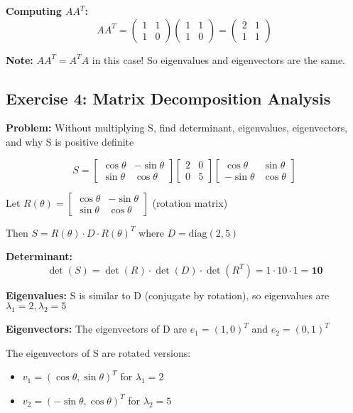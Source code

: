 \documentclass[12pt,a4paper]{article}
\begin{document}
\textbf{Computing $AA^T$:}
$$AA^T = \begin{pmatrix} 1 & 1 \\ 1 & 0 \end{pmatrix}\begin{pmatrix} 1 & 1 \\ 1 & 0 \end{pmatrix} = \begin{pmatrix} 2 & 1 \\ 1 & 1 \end{pmatrix}$$

\textbf{Note:} $AA^T = A^T A$ in this case! So eigenvalues and eigenvectors are the same.

\subsection{Exercise 4: Matrix Decomposition Analysis}

\textbf{Problem:} Without multiplying S, find determinant, eigenvalues, eigenvectors, and why S is positive definite

$$S = \begin{bmatrix} \cos \theta & -\sin \theta \\ \sin \theta & \cos \theta \end{bmatrix}\begin{bmatrix} 2 & 0 \\ 0 & 5 \end{bmatrix}\begin{bmatrix} \cos \theta & \sin \theta \\ -\sin \theta & \cos \theta \end{bmatrix}$$

Let $R(\theta) = \begin{bmatrix} \cos \theta & -\sin \theta \\ \sin \theta & \cos \theta \end{bmatrix}$ (rotation matrix)

Then $S = R(\theta) \cdot D \cdot R(\theta)^T$ where $D = \text{diag}(2, 5)$

\textbf{Determinant:}
$$\det(S) = \det(R) \cdot \det(D) \cdot \det(R^T) = 1 \cdot 10 \cdot 1 = \textbf{10}$$

\textbf{Eigenvalues:}
S is similar to D (conjugate by rotation), so eigenvalues are \textbf{$\lambda_1 = 2, \lambda_2 = 5$}

\textbf{Eigenvectors:}
The eigenvectors of D are $e_1 = (1,0)^T$ and $e_2 = (0,1)^T$

The eigenvectors of S are rotated versions:
\begin{itemize}
    \item \textbf{$v_1 = (\cos \theta, \sin \theta)^T$} for $\lambda_1 = 2$
    \item \textbf{$v_2 = (-\sin \theta, \cos \theta)^T$} for $\lambda_2 = 5$
\end{itemize}
\end{document}
